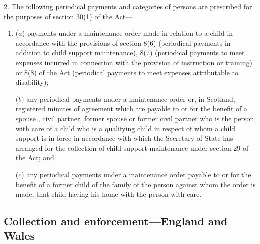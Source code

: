 \documentclass[12pt,a4paper]{article}
\begin{document}
2.  The following periodical payments and categories of persons are prescribed for the purposes of section 30(1) of the Act—
\begin{enumerate}\item[]
($a$) payments under a maintenance order made in relation to a child in accordance with the provisions of section 8(6) (periodical payments in addition to child support maintenance), 8(7) (periodical payments to meet expenses incurred in connection with the provision of instruction or training) or 8(8) of the Act (periodical payments to meet expenses attributable to disability);

($b$) any periodical payments under a maintenance order 
or, in Scotland, registered minutes of agreement %
which are payable to or for the benefit of a spouse%
, civil partner, former spouse or former civil partner  %
who is the person with care of a child who is a qualifying child in respect of whom a child support 
is in force in accordance with which the Secretary of State has arranged for the collection of child support maintenance under section 29 of the Act; and

($c$) any periodical payments under a maintenance order payable to or for the benefit of a former child of the family of the person against whom the order is made, that child having his home with the person with care.
\end{enumerate}


\subsection[3. Collection and enforcement—England and Wales]{Collection and enforcement—England and Wales}
\end{document}

